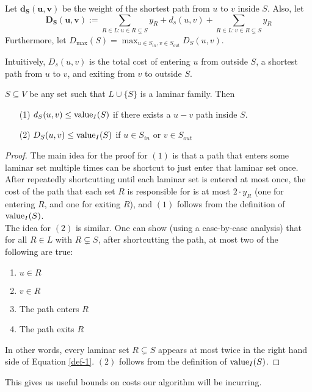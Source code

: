 \begin{definition} Let $\bm{d_S(u,v)}$ be the weight of the shortest path from $u$ to $v$ inside $S$. Also, let \begin{equation}\bm{D_S(u,v)}:=\sum_{R\in L : u\in R\subsetneq S}y_R + d_s(u,v) + \sum_{R\in L : v\in R\subsetneq S}y_R\label{def-1}\end{equation}
	Furthermore, let $D_{\max}(S) = \max_{u \in S_{in}, v \in S_{out}}D_S(u,v)$.
\end{definition}
Intuitively, $D_s(u,v)$ is the total cost of entering $u$ from outside $S$, a shortest path from $u$ to $v$, and exiting from $v$ to outside $S$.\vspace{2mm}
\begin{lemma}\label{lemm:2:D-val} $S\subseteq V$ be any set such that $L\cup \{S\}$ is a laminar family. Then\begin{enumerate}
	\item[(1)] $d_S(u,v)\leq \textup{value}_I(S)$ if there exists a $u-v$ path inside $S$.
	\item[(2)] $D_S(u,v)\leq \textup{value}_I(S)$ if $u\in S_{in}$ or $v\in S_{out}$
	\end{enumerate}
\end{lemma}
\begin{proof}
	The main idea for the proof for $(1)$ is that a path that enters some laminar set multiple times can be shortcut to just enter that laminar set once. After repeatedly shortcutting until each laminar set is entered at most once, the cost of the path that each set $R$ is responsible for is at most $2\cdot y_R$ (one for entering $R$, and one for exiting $R$), and $(1)$ follows from the definition of $\textup{value}_I(S)$.\vspace{2mm}
	\\The idea for $(2)$ is similar. One can show (using a case-by-case analysis) that for all $R\in L$ with $R\subsetneq S$, after shortcutting the path, at most two of the following are true:
	\begin{enumerate}
		\item $u\in R$
		\item $v\in R$
		\item The path enters $R$
		\item The path exits $R$
	\end{enumerate}
	In other words, every laminar set $R\subsetneq S$ appears at most twice in the right hand side of Equation \ref{def-1}. $(2)$ follows from the definition of $\textup{value}_I(S)$.
\end{proof}\vspace{2mm}
This gives us useful bounds on costs our algorithm will be incurring.

